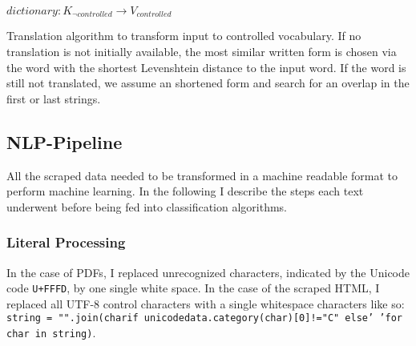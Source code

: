 \begin{algorithm}[h]
  \SetAlgoLined
    $dictionary: K_{\neg controlled} \to V_{controlled}$\;
\caption{Translation algorithm to transform input to controlled vocabulary. If no translation is not initially available, the most similar written form is chosen via the word with the shortest Levenshtein distance to the input word. If the word is still not translated, we assume an shortened form and search for an overlap in the first or last strings.}
\label{lst:translate}
\end{algorithm}

\subsection{NLP-Pipeline}
All the scraped data needed to be transformed in a machine readable format to perform machine learning. In the following I describe the steps each text underwent before being fed into classification algorithms.

\subsubsection{Literal Processing}
In the case of PDFs, I replaced unrecognized characters, indicated by the Unicode code \texttt{U+FFFD}, by one single white space. In the case of the scraped HTML, I replaced all UTF-8 control characters with a single whitespace characters like so: \texttt{string = \allowbreak "".join\allowbreak(char\allowbreak if unicodedata\allowbreak.category(char)[0]\allowbreak !=\allowbreak "C" else\allowbreak ' '\allowbreak for char in string)}.

